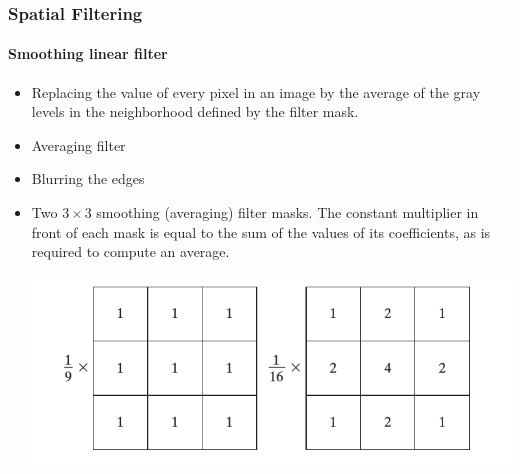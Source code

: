 \documentclass[table]{beamer}
\begin{document}
\begin{frame}
\frametitle{Spatial Filtering}
\framesubtitle{Smoothing linear filter}
\begin{itemize}
\item  Replacing the value of every pixel in an image by the average of the gray levels in the neighborhood defined by the filter mask.
\item Averaging filter 
\item {\color{red} Blurring the edges}
\item Two $3\times 3$ smoothing (averaging) filter masks. The constant multiplier in front of each mask is equal to the sum of the values of its coefficients, as is required to compute an average.
\begin{center}\includegraphics[scale=0.4]{images/Spatial3.png}\end{center}
\end{itemize}
\end{frame}
\end{document}
